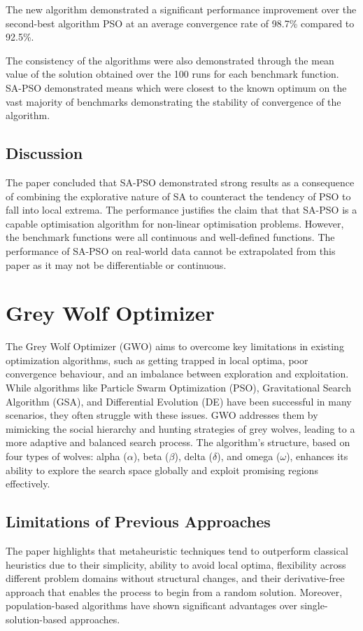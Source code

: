 \documentclass[a4paper, 12pt]{extarticle}
\begin{document}
The new algorithm demonstrated a significant performance improvement over the second-best algorithm PSO at an average convergence rate of 98.7\% compared to 92.5\%.

The consistency of the algorithms were also demonstrated through the mean value of the solution obtained over the 100 runs for each benchmark function. SA-PSO demonstrated means which were closest to the known optimum on the vast majority of benchmarks demonstrating the stability of convergence of the algorithm.

\subsection{Discussion}

The paper concluded that SA-PSO demonstrated strong results as a consequence of combining the explorative nature of SA to counteract the tendency of PSO to fall into local extrema. The performance justifies the claim that that SA-PSO is a capable optimisation algorithm for non-linear optimisation problems. 
However, the benchmark functions were all continuous and well-defined functions. The performance of SA-PSO on real-world data cannot be extrapolated from this paper as it may not be differentiable or continuous.

\newpage
\section{Grey Wolf Optimizer}
The Grey Wolf Optimizer (GWO) aims to overcome key limitations in existing optimization algorithms, such as getting trapped in local optima, poor convergence behaviour, and an imbalance between exploration and exploitation. While algorithms like Particle Swarm Optimization (PSO), Gravitational Search Algorithm (GSA), and Differential Evolution (DE) have been successful in many scenarios, they often struggle with these issues. GWO addresses them by mimicking the social hierarchy and hunting strategies of grey wolves, leading to a more adaptive and balanced search process. The algorithm's structure, based on four types of wolves: alpha ($\alpha$), beta ($\beta$), delta ($\delta$), and omega ($\omega$), enhances its ability to explore the search space globally and exploit promising regions effectively\cite{mirjalili2014grey}.

\subsection{Limitations of Previous Approaches}
The paper \cite{mirjalili2014grey} highlights that metaheuristic techniques tend to outperform classical heuristics due to their simplicity, ability to avoid local optima, flexibility across different problem domains without structural changes, and their derivative-free approach that enables the process to begin from a random solution. Moreover, population-based algorithms have shown significant advantages over single-solution-based approaches.
\end{document}
